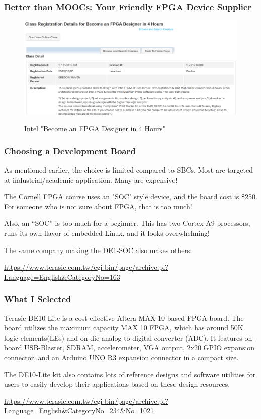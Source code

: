 \documentclass{beamer}
\begin{document}
\begin{frame}
\frametitle{Better than MOOCs:  Your Friendly FPGA Device Supplier}

\begin{figure}[h]
	\centering
	\includegraphics[width=1.0\textwidth]{graphics/fpga_designer_in_4hours.png}
	\centering\bfseries
	\caption{Intel "Become an FPGA Designer in 4 Hours"}
\end{figure}

\end{frame}



\begin{frame}
\frametitle{Choosing a Development Board}

As mentioned earlier, the choice is limited compared to SBCs.  Most are targeted at  industrial/academic application.  Many are expensive!

The Cornell FPGA course uses an "SOC" style device, and the board cost is \$250.
For someone who is not sure about FPGA, that is too much!

Also, an ``SOC'' is too much for a beginner.  This has two Cortex A9 processors, runs its own flavor of embedded Linux, and it looks overwhelming!

The same company making the DE1-SOC also makes others:

{\tiny \url{https://www.terasic.com.tw/cgi-bin/page/archive.pl?Language=English&CategoryNo=163}}

\end{frame}

\begin{frame}
\frametitle{What I Selected}

Terasic DE10-Lite is a cost-effective Altera MAX 10 based FPGA board. The board utilizes the maximum capacity MAX 10 FPGA, which has around 50K logic elements(LEs) and on-die analog-to-digital converter (ADC). It features on-board USB-Blaster, SDRAM, accelerometer, VGA output, 2x20 GPIO expansion connector, and an Arduino UNO R3 expansion connector in a compact size.

The DE10-Lite kit also contains lots of reference designs and software utilities for users to easily develop their applications based on these design resources.

{\tiny
\url{https://www.terasic.com.tw/cgi-bin/page/archive.pl?Language=English&CategoryNo=234&No=1021}}

\end{frame}
\end{document}
